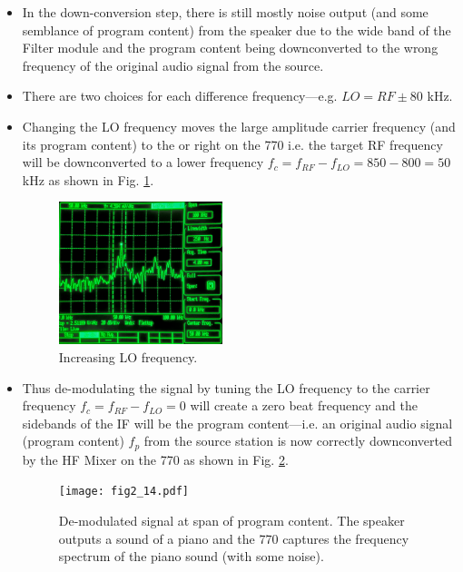 \documentclass[../main.tex]{subfiles}
\begin{document}
\begin{itemize}
    \item In the down-conversion step, there is still mostly noise output (and some semblance of program content) from the speaker due to the wide band of the Filter module and the program content being downconverted to the wrong frequency of the original audio signal from the source.
    \item There are two choices for each difference frequency---e.g. $LO = RF \pm 80$ kHz.
    \newpage 
    \item Changing the LO frequency moves the large amplitude carrier frequency (and its program content) to the or right on the 770 i.e. the target RF frequency will be downconverted to a lower frequency $f_c = f_{RF} - f_{LO} = 850 - 800 = 50$ kHz as shown in Fig. \ref{fig:2.13}.
    \begin{figure}[ht]
        \centering
        \includegraphics[width=0.45\textwidth]{fig2_13.pdf}
        \caption{Increasing LO frequency.}
        \label{fig:2.13}
    \end{figure}
    \item Thus de-modulating the signal by tuning the LO frequency to the carrier frequency $f_c  = f_{RF} - f_{LO} = 0$ will create a zero beat frequency and the sidebands of the IF will be the program content---i.e.
    an original audio signal (program content) $f_p$ from the source station is now correctly downconverted by the HF Mixer on the 770 as shown in Fig. \ref{fig:2.14}. 
    \begin{figure}[ht]
        \centering
        \begin{minipage}{0.45\textwidth}
            \centering
            \texttt{[image: fig2\_14.pdf]}
            \caption{De-modulated signal at span of program content. The speaker outputs a sound of a piano and the 770 captures the frequency spectrum of the piano sound (with some noise).}
            \label{fig:2.14}
        \end{minipage}\hfill

\end{figure}
\end{itemize}
\end{document}
